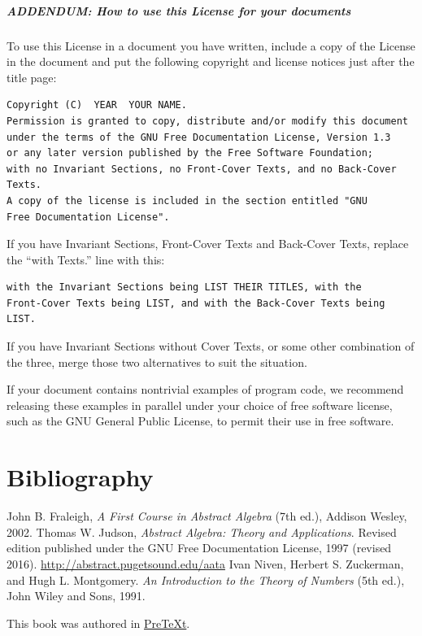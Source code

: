 \documentclass[10pt,openany,oneside]{book}
\theoremstyle{plain}
\theoremstyle{definition}
\theoremstyle{definition}
\theoremstyle{definition}
\theoremstyle{definition}
\numberwithin{equation}{section}
\begin{document}
\paragraph[{ADDENDUM: How to use this License for your documents}]{ADDENDUM: How to use this License for your documents}\hypertarget{gfdl-addendum}{}
To use this License in a document you have written, include a copy of the License in the document and put the following copyright and license notices just after the title page:%
\begin{verbatim}
Copyright (C)  YEAR  YOUR NAME.
Permission is granted to copy, distribute and/or modify this document
under the terms of the GNU Free Documentation License, Version 1.3
or any later version published by the Free Software Foundation;
with no Invariant Sections, no Front-Cover Texts, and no Back-Cover Texts.
A copy of the license is included in the section entitled "GNU
Free Documentation License".
\end{verbatim}
If you have Invariant Sections, Front-Cover Texts and Back-Cover Texts, replace the ``with\textellipsis{} Texts.'' line with this:%
\begin{verbatim}
with the Invariant Sections being LIST THEIR TITLES, with the
Front-Cover Texts being LIST, and with the Back-Cover Texts being LIST.
\end{verbatim}
If you have Invariant Sections without Cover Texts, or some other combination of the three, merge those two alternatives to suit the situation.%
\par
If your document contains nontrivial examples of program code, we recommend releasing these examples in parallel under your choice of free software license, such as the GNU General Public License, to permit their use in free software.%
%
\backmatter
%
\typeout{************************************************}
\typeout{************************************************}
\chapter[{Bibliography}]{Bibliography}\label{references-1}
\begin{referencelist}
\hypertarget{F}{}John B. Fraleigh, \textit{A First Course in Abstract Algebra} (7th ed.), Addison Wesley, 2002.
\hypertarget{J}{}Thomas W. Judson, \textit{Abstract Algebra: Theory and Applications}. Revised edition published under the GNU Free Documentation License, 1997 (revised 2016). \href{http://abstract.pugetsound.edu/aata}{http://abstract.pugetsound.edu/aata}
\hypertarget{NZM}{}Ivan Niven, Herbert S. Zuckerman, and Hugh L. Montgomery. \textit{An Introduction to the Theory of Numbers} (5th ed.), John Wiley and Sons, 1991.
\end{referencelist}
\cleardoublepage
\pagestyle{empty}
\centerline{This book was authored in \href{http://mathbook.pugetsound.edu}{PreTeXt}.%
}
\end{document}
